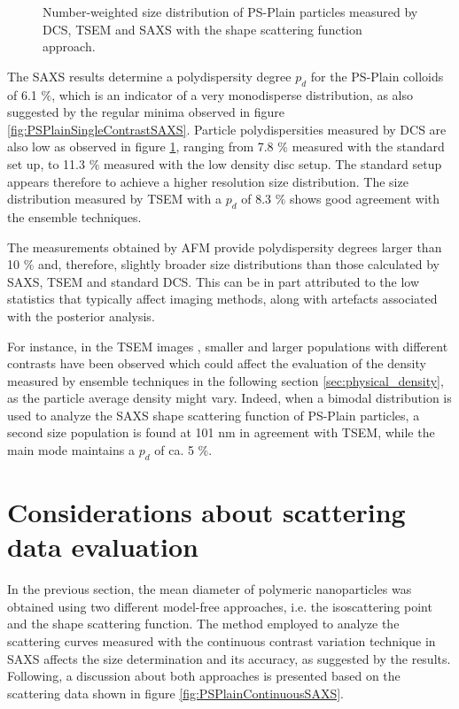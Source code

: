\begin{figure}
	\begin{center}
		
	\end{center}
	\caption[Number-weighted size distribution of PS-Plain particles.]{Number-weighted size distribution of PS-Plain particles measured by DCS, TSEM \citep{nicolet_inter-laboratory_2016} and SAXS with the shape scattering function approach.}
	\label{fig:PSPlainSizeDistribution}
\end{figure}

The SAXS results determine a polydispersity degree $p_d$ for the PS-Plain colloids of 6.1 $\%$, which is an indicator of a very monodisperse distribution, as also suggested by the regular minima observed in figure \ref{fig:PSPlainSingleContrastSAXS}. Particle polydispersities measured by DCS are also low as observed in figure \ref{fig:PSPlainSizeDistribution}, ranging from 7.8 $\%$ measured with the standard set up, to 11.3 $\%$ measured with the low density disc setup. The standard setup appears therefore to achieve a higher resolution size distribution. The size distribution measured by TSEM with a $p_d$ of 8.3 $\%$ shows good agreement with the ensemble techniques.

The measurements obtained by AFM provide polydispersity degrees larger than 10 $\%$ \citep{nicolet_inter-laboratory_2016} and, therefore, slightly broader size distributions than those calculated by SAXS, TSEM and standard DCS. This can be in part attributed to the low statistics that typically affect imaging methods, along with artefacts associated with the posterior analysis.

For instance, in the TSEM images \citep{nicolet_inter-laboratory_2016}, smaller and larger populations with different contrasts have been observed which could affect the evaluation of the density measured by ensemble techniques in the following section \ref{sec:physical_density}, as the particle average density might vary. Indeed, when a bimodal distribution is used to analyze the SAXS shape scattering function of PS-Plain particles, a second size population is found at 101 nm in agreement with TSEM, while the main mode maintains a $p_d$ of ca. 5 $\%$.

\section{Considerations about scattering data evaluation}

In the previous section, the mean diameter of polymeric nanoparticles was obtained using two different model-free approaches, i.e. the isoscattering point and the shape scattering function. The method employed to analyze the scattering curves measured with the continuous contrast variation technique in SAXS affects the size determination and its accuracy, as suggested by the results. Following, a discussion about both approaches is presented based on the scattering data shown in figure \ref{fig:PSPlainContinuousSAXS}.

